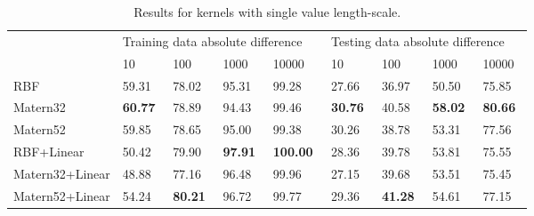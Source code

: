 \documentclass[11pt,a4paper]{article}
\theoremstyle{definition}
\numberwithin{equation}{section}
\begin{document}
	\begin{table}[h!]
		\centering
		\begin{tabular}{l|llll|llll} 
			\toprule
			& \multicolumn{4}{l|}{Training data absolute difference~ ~}          & \multicolumn{4}{l}{Testing data absolute difference~ ~}            \\
			& 10             & 100            & 1000           & 10000           & 10             & 100            & 1000           & 10000           \\ 
			\hline\hline
			RBF             & 59.31          & 78.02          & 95.31          & 99.28           & 27.66          & 36.97          & 50.50          & 75.85           \\
			Matern32        & \textbf{60.77} & 78.89          & 94.43          & 99.46           & \textbf{30.76} & 40.58          & \textbf{58.02} & \textbf{80.66}  \\
			Matern52        & 59.85          & 78.65          & 95.00          & 99.38           & 30.26          & 38.78          & 53.31          & 77.56           \\
			RBF+Linear      & 50.42          & 79.90          & \textbf{97.91} & \textbf{100.00} & 28.36          & 39.78          & 53.81          & 75.55           \\
			Matern32+Linear & 48.88          & 77.16          & 96.48          & 99.96           & 27.15          & 39.68          & 53.51          & 75.45           \\
			Matern52+Linear & 54.24          & \textbf{80.21} & 96.72          & 99.77           & 29.36          & \textbf{41.28} & 54.61          & 77.15           \\
			\bottomrule
		\end{tabular}
		\caption{Results for kernels with single value length-scale. }
		\label{table:res_single_lengthscale}
	\end{table}
	
\end{document}

